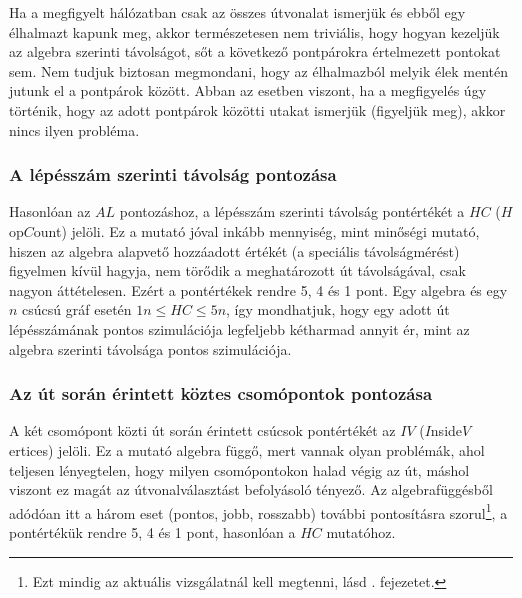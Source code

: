     \begin{note}
      Ha a megfigyelt hálózatban csak az összes útvonalat ismerjük és ebből egy élhalmazt kapunk meg, akkor természetesen nem triviális, hogy hogyan kezeljük az algebra szerinti távolságot, sőt a következő pontpárokra értelmezett pontokat sem. Nem tudjuk biztosan megmondani, hogy az élhalmazból melyik élek mentén jutunk el a pontpárok között. Abban az esetben viszont, ha a megfigyelés úgy történik, hogy az adott pontpárok közötti utakat ismerjük (figyeljük meg), akkor nincs ilyen probléma.
    \end{note}

    \subsubsection{A lépésszám szerinti távolság pontozása}
    Hasonlóan az $AL$ pontozáshoz, a lépésszám szerinti távolság pontértékét a $HC$ ($H$op$C$ount) jelöli. Ez a mutató jóval inkább mennyiség, mint minőségi mutató, hiszen az algebra alapvető hozzáadott értékét (a speciális távolságmérést) figyelmen kívül hagyja, nem törődik a meghatározott út távolságával, csak nagyon áttételesen. Ezért a pontértékek rendre 5, 4 és 1 pont. Egy algebra és egy $n$ csúcsú gráf esetén $1n \leq HC \leq 5n$, így mondhatjuk, hogy egy adott út lépésszámának pontos szimulációja legfeljebb kétharmad annyit ér, mint az algebra szerinti távolsága pontos szimulációja.

    \subsubsection{Az út során érintett köztes csomópontok pontozása}
    A két csomópont közti út során érintett csúcsok pontértékét az $IV$ ($I$nside$V$ertices) jelöli. Ez a mutató algebra függő, mert vannak olyan problémák, ahol teljesen lényegtelen, hogy milyen csomópontokon halad végig az út, máshol viszont ez magát az útvonalválasztást befolyásoló tényező. Az algebrafüggésből adódóan itt a három eset (pontos, jobb, rosszabb) további pontosításra szorul\footnote{Ezt mindig az aktuális vizsgálatnál kell megtenni, lásd . fejezetet.}, a pontértékük rendre 5, 4 és 1 pont, hasonlóan a $HC$ mutatóhoz.

